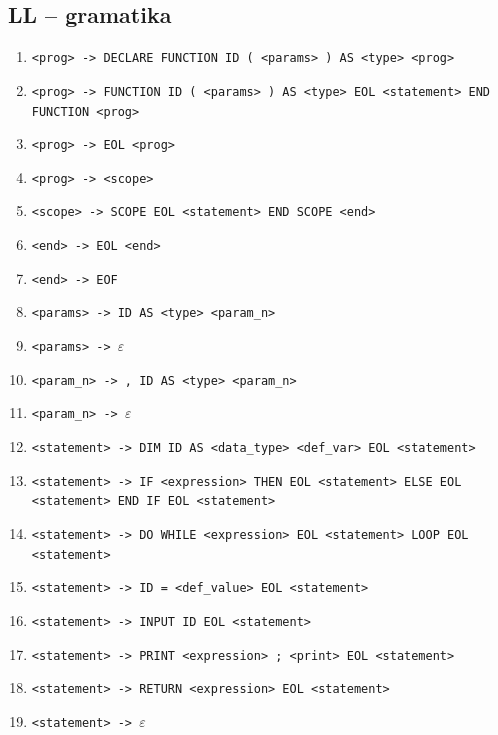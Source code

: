 \documentclass[a4paper, 11pt]{article}
\begin{document}
	\subsection{LL -- gramatika}
	\begin{table}[!ht]
		\centering
		\begin{enumerate}[noitemsep]
			\item \verb|<prog> -> DECLARE FUNCTION ID ( <params> ) AS <type> <prog>|
			\item \verb|<prog> -> FUNCTION ID ( <params> ) AS <type> EOL <statement> END| \newline \verb|FUNCTION <prog>|
			\item \verb|<prog> -> EOL <prog>|
			\item \verb|<prog> -> <scope>|

			\item \verb|<scope> -> SCOPE EOL <statement> END SCOPE <end>|
			\item \verb|<end> -> EOL <end>|
			\item \verb|<end> -> EOF|

			\item \verb|<params> -> ID AS <type> <param_n>|
			\item \verb|<params> -> |$\varepsilon$

			\item \verb|<param_n> -> , ID AS <type> <param_n>|
			\item \verb|<param_n> -> |$\varepsilon$

			\item \verb|<statement> -> DIM ID AS <data_type> <def_var> EOL <statement>|
			\item \verb|<statement> -> IF <expression> THEN EOL <statement> ELSE EOL| \newline \verb|<statement> END IF EOL <statement>|
			\item \verb|<statement> -> DO WHILE <expression> EOL <statement> LOOP EOL| \newline \verb|<statement>|
			\item \verb|<statement> -> ID = <def_value> EOL <statement>|
			\item \verb|<statement> -> INPUT ID EOL <statement>|
			\item \verb|<statement> -> PRINT <expression> ; <print> EOL <statement>|
			\item \verb|<statement> -> RETURN <expression> EOL <statement>|
			\item \verb|<statement> -> |$\varepsilon$


\end{enumerate}
\end{table}
\end{document}
